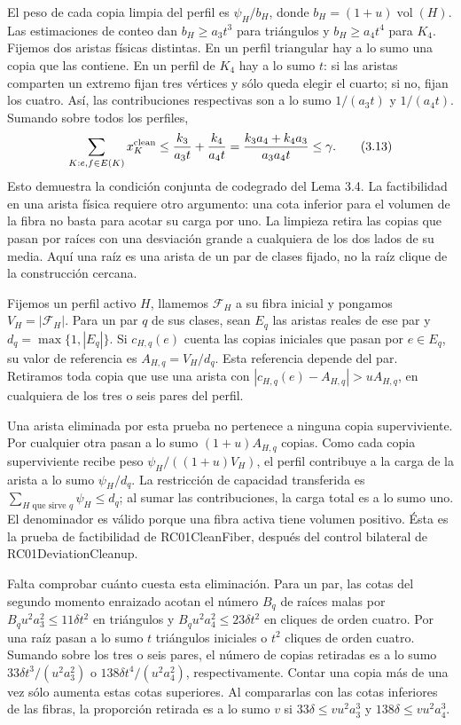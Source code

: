 \documentclass[spanish,11pt,a4paper]{article}
\begin{document}
El peso de cada copia limpia del perfil es \(\psi_H/b_H\), donde \(b_H=(1+u)\operatorname{vol}(H)\). Las estimaciones de conteo dan \(b_H\ge a_3t^3\) para triángulos y \(b_H\ge a_4t^4\) para \(K_4\). Fijemos dos aristas físicas distintas. En un perfil triangular hay a lo sumo una copia que las contiene. En un perfil de \(K_4\) hay a lo sumo \(t\): si las aristas comparten un extremo fijan tres vértices y sólo queda elegir el cuarto; si no, fijan los cuatro. Así, las contribuciones respectivas son a lo sumo \(1/(a_3t)\) y \(1/(a_4t)\). Sumando sobre todos los perfiles, \[
\sum_{K:e,f\in E(K)}x_K^{\rm clean}
\le\frac{k_3}{a_3t}+\frac{k_4}{a_4t}
=\frac{k_3a_4+k_4a_3}{a_3a_4t}\le\gamma.
\tag{3.13}
\] Esto demuestra la condición conjunta de codegrado del Lema 3.4. La factibilidad en una arista física requiere otro argumento: una cota inferior para el volumen de la fibra no basta para acotar su carga por uno. La limpieza retira las copias que pasan por raíces con una desviación grande a cualquiera de los dos lados de su media. Aquí una raíz es una arista de un par de clases fijado, no la raíz clique de la construcción cercana.

Fijemos un perfil activo \(H\), llamemos \(\mathcal F_H\) a su fibra inicial y pongamos \(V_H=|\mathcal F_H|\). Para un par \(q\) de sus clases, sean \(E_q\) las aristas reales de ese par y \(d_q=\max\{1,|E_q|\}\). Si \(c_{H,q}(e)\) cuenta las copias iniciales que pasan por \(e\in E_q\), su valor de referencia es \(A_{H,q}=V_H/d_q\). Esta referencia depende del par. Retiramos toda copia que use una arista con \(|c_{H,q}(e)-A_{H,q}|>uA_{H,q}\), en cualquiera de los tres o seis pares del perfil.

Una arista eliminada por esta prueba no pertenece a ninguna copia superviviente. Por cualquier otra pasan a lo sumo \((1+u)A_{H,q}\) copias. Como cada copia superviviente recibe peso \(\psi_H/((1+u)V_H)\), el perfil contribuye a la carga de la arista a lo sumo \(\psi_H/d_q\). La restricción de capacidad transferida es \(\sum_{H\text{ que sirve }q}\psi_H\le d_q\); al sumar las contribuciones, la carga total es a lo sumo uno. El denominador es válido porque una fibra activa tiene volumen positivo. Ésta es la prueba de factibilidad de {\ttfamily\small RC01CleanFib\discretionary{\hbox{\ensuremath{\hookrightarrow}}}{}{}er}, después del control bilateral de {\ttfamily\small RC01Deviatio\discretionary{\hbox{\ensuremath{\hookrightarrow}}}{}{}nCleanup}.

Falta comprobar cuánto cuesta esta eliminación. Para un par, las cotas del segundo momento enraizado acotan el número \(B_q\) de raíces malas por \(B_qu^2a_3^2\le11\delta t^2\) en triángulos y \(B_qu^2a_4^2\le23\delta t^2\) en cliques de orden cuatro. Por una raíz pasan a lo sumo \(t\) triángulos iniciales o \(t^2\) cliques de orden cuatro. Sumando sobre los tres o seis pares, el número de copias retiradas es a lo sumo \(33\delta t^3/(u^2a_3^2)\) o \(138\delta t^4/(u^2a_4^2)\), respectivamente. Contar una copia más de una vez sólo aumenta estas cotas superiores. Al compararlas con las cotas inferiores de las fibras, la proporción retirada es a lo sumo \(v\) si \(33\delta\le vu^2a_3^3\) y \(138\delta\le vu^2a_4^3\).
\end{document}
